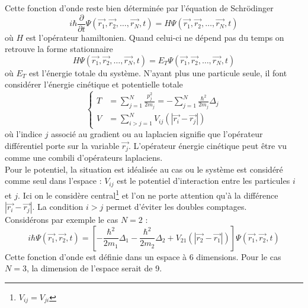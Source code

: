 \documentclass	[11pt, a4paper, openany]{book}
\begin{document}
Cette fonction d'onde reste bien déterminée par l'équation de Schrödinger 
\begin{equation}
i\hbar\frac{\partial}{\partial t} \Psi(\vec{r_1}, \vec{r_2}, \dots, \vec{r_N}, t) = H \Psi(\vec{r_1}, \vec{r_2}, \dots, \vec{r_N}, t)
\end{equation}
où $H$ est l'opérateur hamiltonien. Quand celui-ci ne dépend pas du temps on retrouve la forme stationnaire
\begin{equation}
H\Psi(\vec{r_1}, \vec{r_2}, \dots, \vec{r_N}, t) = E_T\Psi(\vec{r_1}, \vec{r_2}, \dots, \vec{r_N}, t)
\end{equation}
où $E_T$ est l'énergie totale du système. N'ayant plus une particule seule, il font considérer l'énergie cinétique et potentielle totale
\begin{equation}
\left\{\begin{array}{ll}
T &= \sum_{j=1}^N \frac{p_j^2}{2m_j} = - \sum_{j=1}^N \frac{\hbar^2}{2m_j}\Delta_j\\
V &= \sum_{i>j=1}^N V_{ij}(|\vec{r_i}-\vec{r_j}|)
\end{array}\right.
\end{equation}
où l'indice $j$ associé au gradient ou au laplacien signifie que l'opérateur différentiel porte sur la variable $\vec{r_j}$. L'opérateur énergie cinétique peut être vu comme une combili d'opérateurs laplaciens.\\
Pour le potentiel, la situation est idéalisée au cas ou le système est considéré comme seul dans l'espace : $V_{ij}$ est le potentiel d'interaction entre les particules $i$ et $j$. Ici on le considère central\footnote{$V_{ij} = V_{ji}$} et l'on ne porte attention qu'à la différence $|\vec{r_i}-\vec{r_j}|$. La condition $i>j$ permet d'éviter les doubles comptages.\\

Considérons par exemple le cas $N=2$ :
\begin{equation}
i\hbar\Psi(\vec{r_1}, \vec{r_2},t) = \left[-\frac{\hbar^2}{2m_1}\Delta_1 - \frac{\hbar^2}{2m_2}\Delta_2 + V_{21}(|\vec{r_2}-\vec{r_1}|) \right]\Psi(\vec{r_1}, \vec{r_2},t)
\end{equation}
Cette fonction d'onde est définie dans un espace à 6 dimensions. Pour le cas $N=3$, la dimension de l'espace serait de 9.
\end{document}
